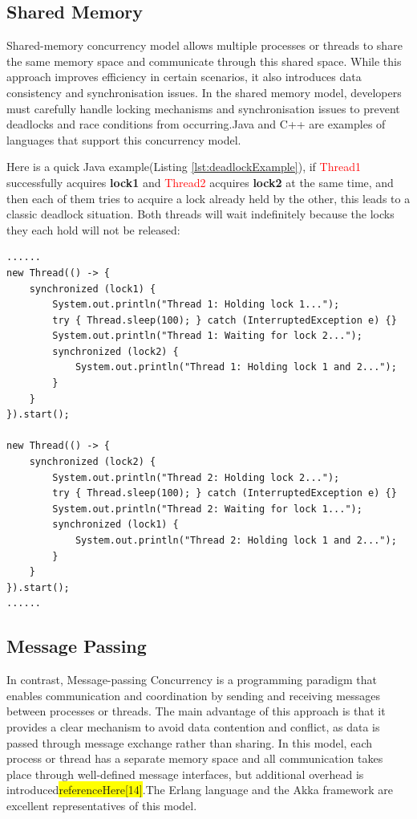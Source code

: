 \documentclass{l4proj}
\begin{document}
\subsection{Shared Memory}
Shared-memory concurrency model allows multiple processes or threads to share the same memory space and communicate through this shared space. While this approach improves efficiency in certain scenarios, it also introduces data consistency and synchronisation issues. In the shared memory model, developers must carefully handle locking mechanisms and synchronisation issues to prevent deadlocks and race conditions from occurring.Java and C++ are examples of languages that support this concurrency model.

Here is a quick Java example(Listing \ref{lst:deadlockExample}), if \textcolor{red}{Thread1} successfully acquires \textbf{lock1} and \textcolor{red}{Thread2} acquires \textbf{lock2} at the same time, and then each of them tries to acquire a lock already held by the other, this leads to a classic deadlock situation. Both threads will wait indefinitely because the locks they each hold will not be released:

\lstset{style=javastyle}
\begin{lstlisting}[caption={Java example demonstrating a potential deadlock}, label={lst:deadlockExample}]
......
new Thread(() -> {
    synchronized (lock1) {
        System.out.println("Thread 1: Holding lock 1...");
        try { Thread.sleep(100); } catch (InterruptedException e) {}
        System.out.println("Thread 1: Waiting for lock 2...");
        synchronized (lock2) {
            System.out.println("Thread 1: Holding lock 1 and 2...");
        }
    }
}).start();
        
new Thread(() -> {
    synchronized (lock2) {
        System.out.println("Thread 2: Holding lock 2...");
        try { Thread.sleep(100); } catch (InterruptedException e) {}
        System.out.println("Thread 2: Waiting for lock 1...");
        synchronized (lock1) {
            System.out.println("Thread 2: Holding lock 1 and 2...");
        }
    }
}).start();
......
\end{lstlisting}

\subsection{Message Passing}
In contrast, Message-passing Concurrency is a programming paradigm that enables communication and coordination by sending and receiving messages between processes or threads. The main advantage of this approach is that it provides a clear mechanism to avoid data contention and conflict, as data is passed through message exchange rather than sharing. In this model, each process or thread has a separate memory space and all communication takes place through well-defined message interfaces, but additional overhead is introduced\colorbox{yellow}{referenceHere[14]}.The Erlang language and the Akka framework are excellent representatives of this model.
\end{document}
